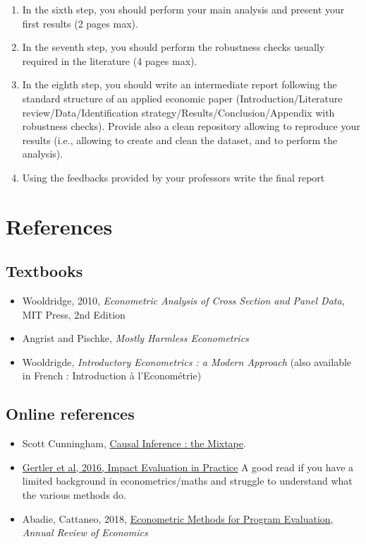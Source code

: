 \documentclass[a4paper,french,11pt]{article}
\begin{document}
\begin{enumerate}
  \item In the sixth step, you should perform your main analysis and present your first results (2 pages max).
  \item In the seventh step, you should perform the robustness checks usually required in the literature (4 pages max). 
  \item In the eighth step, you should write an intermediate report following the standard structure of an applied economic paper (Introduction/Literature review/Data/Identification strategy/Results/Conclusion/Appendix with robustness checks). Provide also a clean repository allowing to reproduce your results (i.e., allowing to create and clean the dataset, and to perform the analysis). 
  \item Using the feedbacks provided by your professors write the final report

\end{enumerate}

\section{References}



 \subsection*{Textbooks}

\begin{itemize}
  \item Wooldridge, 2010, \textit{Econometric Analysis of Cross Section and Panel Data}, MIT Press, 2nd Edition

\item Angrist and Pischke, \textit{Mostly Harmless Econometrics}

\item Wooldrigde, \textit{Introductory Econometrics : a Modern Approach} (also available in French : Introduction à l'Econométrie)
\end{itemize}

\subsection*{Online references}

\begin{itemize}
  \item Scott Cunningham, \href{https://mixtape.scunning.com/}{Causal Inference : the Mixtape}.


\item \href{https://openknowledge.worldbank.org/bitstream/handle/10986/25030/9781464807794.pdf}{Gertler et al, 2016, Impact Evaluation in Practice}
A good read if you have a limited background in econometrics/maths and struggle to understand what the various methods do.

\item Abadie, Cattaneo, 2018, \href{https://economics.mit.edu/sites/default/files/publications/ARE-typo-Fig4-corrected.pdf}{ Econometric Methods for Program Evaluation}, \textit{Annual Review of Economics}

\end{itemize}
\end{document}
